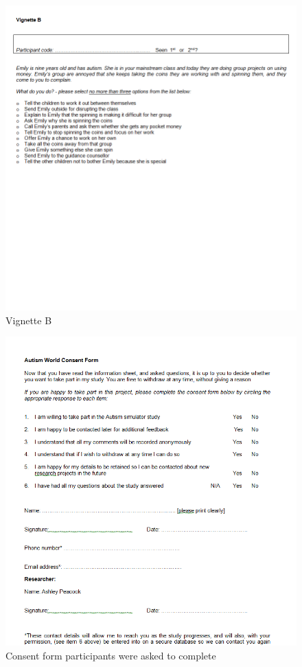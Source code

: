 \begin{figure}[H]
\centering
\includegraphics[scale=0.7]{images/appendix/summative_vb.png}
\caption{Vignette B}
\end{figure}

\begin{figure}[H]
\centering
\includegraphics[scale=0.7]{images/appendix/summative_consentform.png}
\caption{Consent form participants were asked to complete}
\end{figure}


